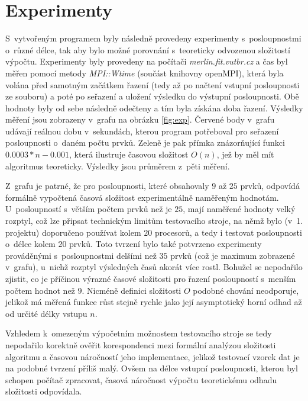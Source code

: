 \documentclass[a4paper, 12pt]{article}
\begin{document}
\section{Experimenty}
\label{sec:exprmts}

S~vytvořeným programem byly následně provedeny experimenty s~posloupnostmi o~různé délce, tak aby bylo
možné porovnání s~teoreticky odvozenou složitostí výpočtu.
Experimenty byly provedeny na počítači \emph{merlin.fit.vutbr.cz} a čas byl měřen pomocí
metody \emph{MPI::Wtime} (součást knihovny openMPI), která byla volána před samotným začátkem řazení (tedy až po načtení vstupní posloupnosti ze souboru)
a poté po seřazení a uložení výsledku do výstupní posloupnosti.
Obě hodnoty byly od sebe následně odečteny a tím byla získána doba řazení.
Výsledky měření jsou zobrazeny v~grafu na obrázku \ref{fig:exp}.
Červené body v~grafu udávají reálnou dobu v~sekundách, kterou program potřeboval pro seřazení
posloupnosti o~daném počtu prvků.
Zeleně je pak přímka znázorňující funkci $0.0003*n-0.001$, která ilustruje
časovou složitost $O(n)$, jež by měl mít algoritmus teoreticky.
Výsledky jsou průměrem z~pěti měření.

Z~grafu je patrné, že pro posloupnosti, které obsahovaly $9$ až $25$ prvků, odpovídá formálně vypočtená časová složitost
experimentálně naměřeným hodnotám.
U~posloupností s~větším počtem prvků než je $25$, mají naměřené hodnoty velký rozptyl, což lze připsat
technickým limitům testovacího stroje, na němž bylo (v~1. projektu) doporučeno používat kolem $20$ procesorů, a tedy
i testovat posloupnosti o~délce kolem $20$ prvků.
Toto tvrzení bylo také potvrzeno experimenty prováděnými s~posloupnostmi delšími než $35$ prvků (což je maximum zobrazené v~grafu),
u~nichž rozptyl výsledných časů akorát více rostl.
Bohužel se nepodařilo zjistit, co je příčinou výrazné časové složitosti pro řazení posloupností s~menším počtem hodnot než $9$.
Nicméně definici složitosti $O$ podobné chování neodporuje, jelikož má měřená funkce růst stejně rychle jako její asymptotický horní odhad
až od určité délky vstupu $n$.

Vzhledem k~omezeným výpočetním možnostem testovacího stroje se tedy nepodařilo korektně ověřit korespondenci mezi formální analýzou složitosti
algoritmu a časovou náročností jeho implementace, jelikož testovací vzorek dat je na podobné tvrzení příliš malý.
Ovšem na délce vstupní posloupnosti, kterou byl schopen počítač zpracovat, časová náročnost výpočtu teoretickému odhadu složitosti odpovídala.
\end{document}
